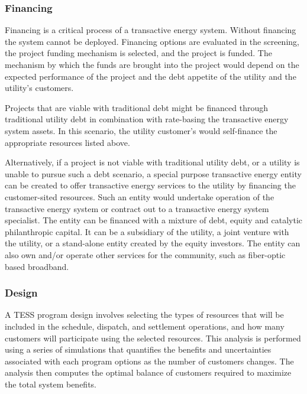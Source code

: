 \subsubsection{Financing}

Financing is a critical process of a transactive energy system. Without financing the system cannot be deployed.  Financing options are evaluated in the screening, the project funding mechanism is selected, and the project is funded.  The mechanism by which the funds are brought into the project would depend on the expected performance of the project and the debt appetite of the utility and the utility's customers.  

Projects that are viable with traditional debt might be financed through traditional utility debt in combination with rate-basing the transactive energy system assets.  In this scenario, the utility customer's would self-finance the appropriate resources listed above.  

Alternatively, if a project is not viable with traditional utility debt, or a utility is unable to pursue such a debt scenario, a special purpose transactive energy entity can be created to offer transactive energy services to the utility by financing the customer-sited resources.  Such an entity would undertake operation of the transactive energy system or contract out to a transactive energy system specialist.  The entity can be financed with a mixture of debt, equity and catalytic philanthropic capital. It can be a subsidiary of the utility, a joint venture with the utility, or a stand-alone entity created by the equity investors. The entity can also own and/or operate other services for the community, such as fiber-optic based broadband.  

\subsubsection{Design}

A TESS program design involves selecting the types of resources that will be included in the schedule, dispatch, and settlement operations, and how many customers will participate using the selected resources. This analysis is performed using a series of simulations that quantifies the benefits and uncertainties associated with each program options as the number of customers changes. The analysis then computes the optimal balance of customers required to maximize the total system benefits.

